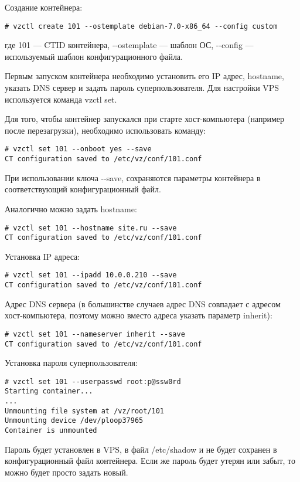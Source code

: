 Создание контейнера:
\begin{lstlisting}
# vzctl create 101 --ostemplate debian-7.0-x86_64 --config custom
\end{lstlisting}
где 101 --- CTID контейнера, -{}-ostemplate --- шаблон ОС, -{}-config --- используемый шаблон конфигурационного файла.

Первым запуском контейнера необходимо установить его IP адрес, hostname, указать DNS сервер и задать пароль суперпользователя.
Для настройки VPS используется команда vzctl set.

Для того, чтобы контейнер запускался при старте хост-компьютера (например после перезагрузки), необходимо использовать команду:
\begin{lstlisting}
# vzctl set 101 --onboot yes --save
CT configuration saved to /etc/vz/conf/101.conf
\end{lstlisting}

При использовании ключа -{}-save, сохраняются параметры контейнера в соответствующий конфигурационный файл.

Аналогично можно задать hostname:
\begin{lstlisting}
# vzctl set 101 --hostname site.ru --save
CT configuration saved to /etc/vz/conf/101.conf
\end{lstlisting}

Установка IP адреса:
\begin{lstlisting}
# vzctl set 101 --ipadd 10.0.0.210 --save
CT configuration saved to /etc/vz/conf/101.conf
\end{lstlisting}

Адрес DNS сервера (в большинстве случаев адрес DNS совпадает с адресом хост-компьютера, поэтому можно вместо адреса указать параметр inherit):
\begin{lstlisting}
# vzctl set 101 --nameserver inherit --save
CT configuration saved to /etc/vz/conf/101.conf
\end{lstlisting}

Установка пароля суперпользователя:
\begin{lstlisting}
# vzctl set 101 --userpasswd root:p@ssw0rd
Starting container...
...
Unmounting file system at /vz/root/101
Unmounting device /dev/ploop37965
Container is unmounted
\end{lstlisting}

Пароль будет установлен в VPS, в файл /etc/shadow и не будет сохранен в конфигурационный файл контейнера.
Если же пароль будет утерян или забыт, то можно будет просто задать новый.


